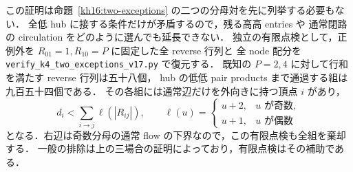 この証明は命題~\ref{kh16:two-exceptions} の二つの分母対を先に列挙する必要もない．
全低 hub に接する条件だけが矛盾するので，残る高高 entries や
通常閉路の circulation をどのように選んでも延長できない．
独立の有限点検として，正例外を $R_{01}=1,R_{10}=P$ に固定した全 reverse 行列と
全 node 配分を \nolinkurl{verify_k4_two_exceptions_v17.py} で復元する．
既知の $P=2,4$ に対して行和を満たす reverse 行列は五十八個，
hub の低低 pair products まで通過する組は九百五十四個である．
その各組には通常辺だけを外向きに持つ頂点 $i$ があり，
\[
 d_i<\sum_{i\to j}\ell(|R_{ij}|),\qquad
 \ell(u)=\begin{cases}u+2,&u\text{ が奇数},\\u+1,&u\text{ が偶数}\end{cases}
\]
となる．右辺は奇数分母の通常 flow の下界なので，この有限点検も全組を棄却する．
一般の排除は上の三場合の証明によっており，有限点検はその補助である．
